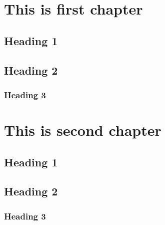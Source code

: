 \documentclass[12pt, a4paper,oneside]{book}
\begin{document}
	\dominitoc \tableofcontents \adjustmtc
	
	\chapter{This is first chapter}
	
	\section*{Heading 1}
	\lipsum[1]
	\lipsum[2]
	\lipsum[3]
	\section*{Heading 2}
	\lipsum[1]
	\lipsum[2]
	\lipsum[3]
	\subsection*{Heading 3}
	\lipsum[1]
	\lipsum[2]
	\lipsum[3]
		
	\chapter{This is second chapter}
	\section*{Heading 1}
	\lipsum[1]
	\lipsum[2]
	\lipsum[3]
	\section*{Heading 2}
	\lipsum[1]
	\lipsum[2]
	\lipsum[3]
	\subsection*{Heading 3}
	\lipsum[1]
	\lipsum[2]
	\lipsum[3]
	
\end{document}

